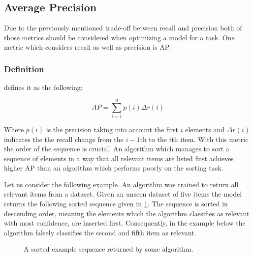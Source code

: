 \subsection{Average Precision}
\label{chp:fundamentals:sec:metrics:subsec:average_precision}

Due to the previously mentioned trade-off between recall and precision both of those metrics should be considered when optimizing a model for a task.
One metric which considers recall as well as precision is \ac{AP}.

\subsubsection{Definition}
\label{chp:fundamentals:sec:metrics:subsec:average_precision:definition}

\Textcite{Zhu:2004} defines it as the following:

\begin{equation}\label{eq:average_precision}
    AP = \sum_{i=1}^n {p(i)\Delta r(i)}
\end{equation}

Where $p(i)$ is the precision taking into account the first $i$ elements and $\Delta r(i)$ indicates the the recall change from the $i-1$th to the $i$th item.
With this metric the order of the sequence is crucial.
An algorithm which manages to sort a sequence of elements in a way that all relevant items are listed first achieves higher AP than an algorithm which performs poorly on the sorting task.

Let us consider the following example.
An algorithm was trained to return all relevant items from a dataset.
Given an unseen dataset of five items the model returns the following sorted sequence given in \cref{fig:metrics:average_precision:sample}.
The sequence is sorted in descending order, meaning the elements which the algorithm classifies as relevant with most confidence, are inserted first.
Consequently, in the example below the algorithm falsely classifies the second and fifth item as relevant.

\begin{figure}[htpb]
    \centering
    \def\svgwidth{\columnwidth}
    
    \caption[Example Sequence]{A sorted example sequence returned by some algorithm.}\label{fig:metrics:average_precision:sample}
\end{figure}

